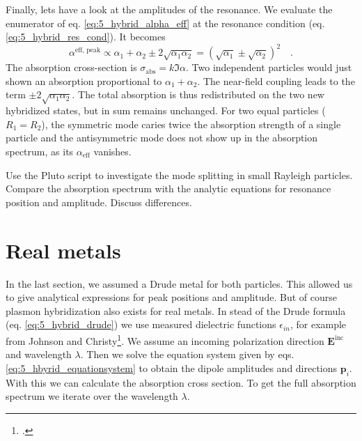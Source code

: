 Finally, lets have a look at the amplitudes of the resonance. We evaluate the enumerator of eq.  \ref{eq:5_hybrid_alpha_eff}
 at the resonance condition (eq. \ref{eq:5_hybrid_res_cond}). It becomes
 \begin{equation}
 \alpha^\text{eff, peak} \propto \alpha_1  + \alpha_2  \pm 2 \sqrt{\alpha_1 \alpha_2} = \left( \sqrt{\alpha_1}  \pm \sqrt{\alpha_2} \right)^2 \quad .
\end{equation}
The absorption cross-section is $\sigma_\text{abs} = k \Im {\alpha}$. Two independent particles would just shown an absorption proportional to $\alpha_1  + \alpha_2$. The near-field coupling leads to the term $\pm 2 \sqrt{\alpha_1 \alpha_2}$. The total absorption is thus redistributed on the two new hybridized states, but in sum remains unchanged.
 For two equal particles ($R_1 = R_2$), the symmetric mode caries twice the absorption strength of a single  particle and the antisymmetric mode does not show up in the absorption spectrum, as its $\alpha_\text{eff}$ vanishes.

\begin{questions}

\item Use the Pluto script to investigate the mode splitting in small Rayleigh particles. Compare the absorption spectrum with the analytic equations for resonance position and amplitude. Discuss differences.
\end{questions}



\section{Real metals}

In the last section, we assumed a Drude metal for both particles. This allowed us to give analytical expressions for peak positions and amplitude. But of course plasmon hybridization also exists for real metals. In stead of the Drude formula (eq. \ref{eq:5_hybrid_drude}) we use measured dielectric functions $\epsilon_{in}$, for example from Johnson and Christy\footcite{JC_gold72}. We assume an incoming polarization direction $\mathbf{E}^\text{inc}$ and wavelength $\lambda$. Then we solve the equation system given by eqs. \ref{eq:5_hbyrid_equationsystem}  to obtain the dipole amplitudes and directions $\mathbf{p}_i$. With this we can calculate  the absorption cross section. To get the full absorption  spectrum we iterate over the wavelength $\lambda$.


